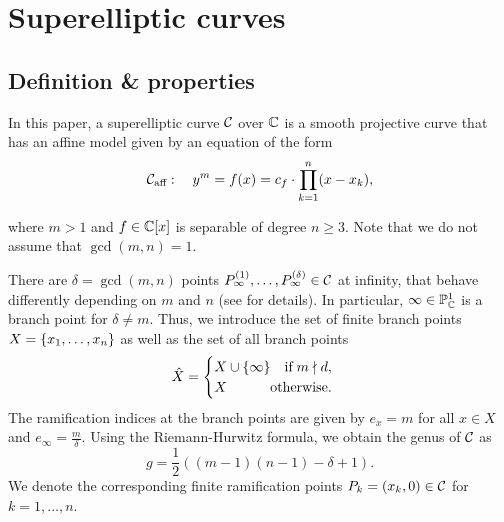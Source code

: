 \documentclass[main.tex]{subfiles}
\begin{document}
  \section{Superelliptic curves}\label{sec:se_curves}

  \subsection{Definition \& properties}\label{subsec:se_def}

    \begin{defn}\label{def:se_curve}
    In this paper, a superelliptic curve $\mathcal{C}$ over $\mathbb{C}$ is a smooth projective curve that has an affine model given by an equation of the form
   \begin{equation}\label{eq:aff_model}
    \mathcal{C}_{\text{aff}} : \quad y^m = f(x) =  c_f \cdot \prod_{k=1}^n (x-x_k),
   \end{equation}
   \end{defn}
   \noindent
   where $m > 1$ and $f \in \mathbb{C}[x]$ is separable of degree $n \ge 3$. Note that we do not assume that $\gcd(m,n) = 1$.

  There are $\delta = \gcd(m,n)$ points $P_{\infty}^{(1)},\dots,P_{\infty}^{(\delta)} \in \mathcal{C}$ at infinity, that behave differently depending on $m$ and $n$ (see \cite[\S 1]{CT1996} for details).
  In particular, $\infty \in \mathbb{P}^1_{\mathbb{C}}$ is a branch point for $\delta \ne m$. Thus, we introduce the set of finite branch points $X = \{ x_1,\dots,x_n \}$ as well as the set of all branch points
  \begin{align}\label{eq:branch_points}
         \hat{X} = \begin{cases}   X \cup \{ \infty \} \quad \text{if} \; m  \nmid  d,\\
         X \hfill \text{otherwise.}
     \end{cases}
  \end{align}
  The ramification indices at the branch points are given by $e_x = m$ for all $x \in X$ and $e_{\infty} = \frac{m}{\delta}$. Using the
  Riemann-Hurwitz formula, we obtain the genus of $\mathcal{C}$ as
  \begin{equation}\label{eq:genus}
    g = \frac{1}{2}( (m-1)(n-1) - \delta + 1).
  \end{equation}
  We denote the corresponding finite ramification points $P_k = (x_k,0) \in \mathcal{C}$ for $k = 1,\dots,n$.
\end{document}
